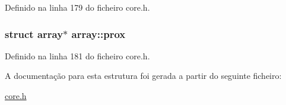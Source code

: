 Definido na linha 179 do ficheiro core.\-h.

\hypertarget{structarray_ac5278e82af38bcc76811769de4bd4400}{
\subsubsection[{prox}]{\setlength{\rightskip}{0pt plus 5cm}struct {\bf array}$\ast$ array\-::prox}}\label{structarray_ac5278e82af38bcc76811769de4bd4400}


Definido na linha 181 do ficheiro core.\-h.



A documentação para esta estrutura foi gerada a partir do seguinte ficheiro\-:\begin{DoxyCompactItemize}
\item 
\hyperlink{core_8h}{core.\-h}\end{DoxyCompactItemize}
